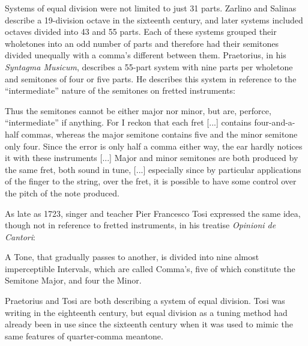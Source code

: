 Systems of equal division were not limited to just 31 parts.  Zarlino and Salinas
describe a 19-division octave in the sixteenth century, and later systems included
octaves divided into 43 and 55 parts.  Each of these systems grouped their wholetones
into an odd number of parts and therefore had their semitones divided unequally with a
comma's different between them. Praetorius, in his \textit{Syntagma Musicum}, describes
a 55-part system with nine parts per wholetone and semitones of four or five parts.  He
describes this system in reference to the ``intermediate'' nature of the semitones on
fretted instruments:
\begin{blocks}
Thus the semitones cannot be either major nor minor, but are, perforce, ``intermediate''
if anything. For I reckon that each fret [...] contains four-and-a-half commas, whereas
the major semitone contains five and the minor semitone only four. Since the error is
only half a comma either way, the ear hardly notices it with these instruments [...]
Major and minor semitones are both produced by the same fret, both sound in tune, [...]
especially since by particular applications of the finger to the string, over the fret,
it is possible to have some control over the pitch of the note produced.
\autocite[68]{MP:1}
\end{blocks}
As late as 1723, singer and teacher Pier Francesco Tosi expressed the same idea, though
not in reference to fretted instruments, in his treatise \textit{Opinioni de Cantori}:
\begin{blocks}
A Tone, that gradually passes to another, is divided into nine almost imperceptible
Intervals, which are called Comma's, five of which constitute the Semitone Major, and four
the Minor.
\autocite[20]{PFT:1}
\end{blocks}
Praetorius and Tosi are both describing a system of equal division.  Tosi was writing in
the eighteenth century, but equal division as a tuning method had already been in use
since the sixteenth century when it was used to mimic the same features of quarter-comma
meantone.

